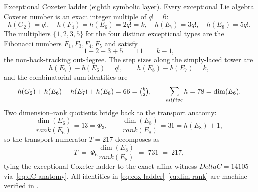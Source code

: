 \documentclass[12pt,a4paper]{article}
\def\mathrm#1{#1}%
\def\textbf#1{#1}%
\def\text#1{#1}%
\def\Delta{Delta}%
\def\Phi#1{Phi#1}%
\def\cdot{ }%
\theoremstyle{definition}
\begin{document}
\medskip
\noindent\textbf{Exceptional Coxeter ladder (eighth symbolic layer).}\quad
Every exceptional Lie algebra Coxeter number is an exact integer
multiple of $q! = 6$:
\begin{equation}
h(G_2)=q!, \quad
h(F_4)=h(E_6)=2q!=k, \quad
h(E_7)=3q!, \quad
h(E_8)=5q!.
\label{eq:cox-ladder}
\end{equation}
The multipliers $\{1,2,3,5\}$ for the four distinct exceptional types
are the Fibonacci numbers $F_1,F_3,F_4,F_5$ and satisfy
\begin{equation}
1+2+3+5 \;=\; 11 \;=\; k-1,
\label{eq:cox-fibonacci}
\end{equation}
the non-back-tracking out-degree.  The step sizes along the
simply-laced tower are
\begin{equation}
h(E_7)-h(E_6)=q!, \qquad h(E_8)-h(E_7)=k,
\label{eq:cox-steps}
\end{equation}
and the combinatorial sum identities are
\begin{equation}
h(G_2)+h(E_6)+h(E_7)+h(E_8) = 66 = \tbinom{k}{2},
\qquad
\sum_{\text{all five}} h = 78 = \dim(E_6).
\label{eq:cox-sums}
\end{equation}
Two dimension--rank quotients bridge back to the transport anatomy:
\begin{equation}
\frac{\dim(E_6)}{\mathrm{rank}(E_6)} = 13 = \Phi_3, \qquad
\frac{\dim(E_8)}{\mathrm{rank}(E_8)} = 31 = h(E_8)+1,
\label{eq:dim-rank}
\end{equation}
so the transport numerator $T=217$ decomposes as
\[
T \;=\; \Phi_6 \cdot \frac{\dim(E_8)}{\mathrm{rank}(E_8)}
  \;=\; 7 \cdot 31 \;=\; 217,
\]
tying the exceptional Coxeter ladder to the exact affine witness
$\Delta C = 14105$ via~\eqref{eq:dC-anatomy}.  All identities in
\eqref{eq:cox-ladder}--\eqref{eq:dim-rank} are machine-verified in
.
\end{document}

